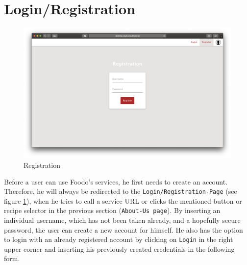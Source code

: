 \section*{Login/Registration}
\vspace{-2em}
\begin{figure}[H]
	\captionsetup{justification=centering}
	\begin{center}
		\includegraphics[scale=0.28]{Ressourcen/img/screenshots/screenshotD.png}
		\vspace{-3em}
		\caption{Registration}
		\label{fig:registration}
	\end{center}
\end{figure}
Before a user can use Foodo’s services, he first needs to create an account. Therefore, he will always be redirected to the \texttt{Login/Registration-Page} (see figure \ref{fig:registration}), when he tries to call a service URL or clicks the mentioned button or recipe selector in the previous section (\texttt{About-Us page}). By inserting an individual username, which has not been taken already, and a hopefully secure password, the user can create a new account for himself. He also has the option to login with an already registered account by clicking on \texttt{Login} in the right upper corner and inserting his previously created credentials in the following form.
